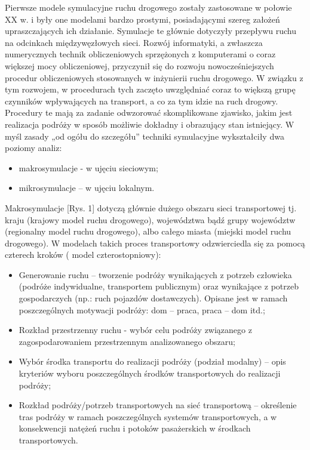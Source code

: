 \documentclass{sprawozdanie-agh}
\begin{document}
\begin{multicols}{2}
		Pierwsze modele symulacyjne ruchu drogowego zostały zastosowane w połowie XX w. i były one modelami bardzo prostymi, posiadającymi szereg założeń upraszczających ich działanie. Symulacje te głównie dotyczyły przepływu ruchu na odcinkach międzywęzłowych sieci. Rozwój informatyki, a zwłaszcza numerycznych technik obliczeniowych sprzężonych z komputerami o coraz większej mocy obliczeniowej, przyczynił się do rozwoju nowocześniejszych procedur obliczeniowych stosowanych w inżynierii ruchu drogowego. W związku z tym rozwojem, w procedurach tych zaczęto uwzględniać coraz to większą grupę czynników wpływających na transport, a co za tym idzie na ruch drogowy. Procedury te mają za zadanie odwzorować skomplikowane zjawisko, jakim jest realizacja podróży w sposób możliwie dokładny i obrazujący stan istniejący. W myśl zasady „od ogółu do szczegółu” techniki symulacyjne wykształciły dwa poziomy analiz:

		\begin{itemize}
			\item makrosymulacje - w ujęciu sieciowym;
			\item mikrosymulacje – w ujęciu lokalnym.
		\end{itemize}


		Makrosymulacje [Rys. 1] dotyczą głównie dużego obszaru sieci transportowej tj. kraju (krajowy model ruchu drogowego), województwa bądź grupy województw (regionalny model ruchu drogowego), albo całego miasta (miejski model ruchu drogowego). W modelach takich proces transportowy odzwierciedla się za pomocą czterech kroków ( model czterostopniowy):

		\begin{itemize}
			\item  Generowanie ruchu – tworzenie podróży wynikających z potrzeb człowieka (podróże indywidualne, transportem publicznym) oraz wynikające z potrzeb gospodarczych (np.: ruch pojazdów dostawczych). Opisane jest w ramach poszczególnych motywacji podróży: dom – praca, praca – dom itd.;
			\item Rozkład przestrzenny ruchu - wybór celu podróży związanego z zagospodarowaniem przestrzennym analizowanego obszaru;
			\item Wybór środka transportu do realizacji podróży (podział modalny) – opis kryteriów wyboru poszczególnych środków transportowych do realizacji podróży;
			\item Rozkład podróży/potrzeb transportowych na sieć transportową – określenie tras podróży w ramach poszczególnych systemów transportowych, a w konsekwencji natężeń ruchu i potoków pasażerskich w środkach transportowych.
		\end{itemize}


\end{multicols}
\end{document}
